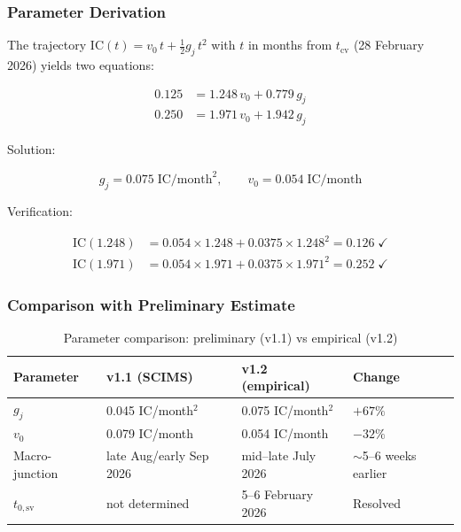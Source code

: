 \documentclass[12pt,a4paper]{article}
\newcommand{\gj}{g_j}
\newcommand{\IC}{\mathrm{IC}}
\begin{document}
\subsubsection{Parameter Derivation}

The trajectory $\IC(t) = v_0\,t + \tfrac{1}{2}\gj\,t^2$ with $t$ in months from $t_{\mathrm{cv}}$ (28 February 2026) yields two equations:

\begin{align}
0.125 &= 1.248\,v_0 + 0.779\,\gj \label{eq:cal1} \\
0.250 &= 1.971\,v_0 + 1.942\,\gj \label{eq:cal2}
\end{align}

Solution:

\begin{equation}\label{eq:gj_empirical}
\boxed{\gj = 0.075 \;\text{IC/month}^2}, \qquad \boxed{v_0 = 0.054 \;\text{IC/month}}
\end{equation}

Verification:

\begin{align*}
\IC(1.248) &= 0.054 \times 1.248 + 0.0375 \times 1.248^2 = 0.126 \;\checkmark \\
\IC(1.971) &= 0.054 \times 1.971 + 0.0375 \times 1.971^2 = 0.252 \;\checkmark
\end{align*}

\subsubsection{Comparison with Preliminary Estimate}

\begin{table}[H]
\centering
\caption{Parameter comparison: preliminary (v1.1) vs empirical (v1.2)}
\label{tab:param_compare}
\begin{tabular}{@{}llll@{}}
\toprule
\textbf{Parameter} & \textbf{v1.1 (SCIMS)} & \textbf{v1.2 (empirical)} & \textbf{Change} \\
\midrule
$\gj$ & 0.045 IC/month$^2$ & 0.075 IC/month$^2$ & $+67\%$ \\
$v_0$ & 0.079 IC/month & 0.054 IC/month & $-32\%$ \\
Macro-junction & late Aug/early Sep 2026 & mid--late July 2026 & $\sim$5--6 weeks earlier \\
$t_{0,\mathrm{sv}}$ & not determined & 5--6 February 2026 & Resolved \\
\bottomrule
\end{tabular}
\end{table}
\end{document}
